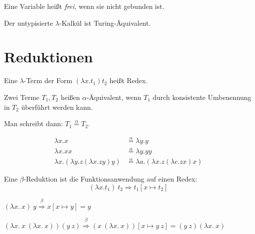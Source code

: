 \begin{definition}%
    Eine Variable heißt \textit{frei}, wenn sie nicht gebunden ist.
\end{definition}

\begin{satz}
    Der untypisierte $\lambda$-Kalkül ist Turing-Äquivalent.
\end{satz}

\section{Reduktionen}
\begin{definition}[Redex]%
    Eine $\lambda$-Term der Form $(\lambda x. t_1) t_2$ heißt Redex.
\end{definition}

\begin{definition}%
    Zwei Terme $T_1, T_2$ heißen $\alpha$-Äquivalent, wenn $T_1$ durch 
    konsistente Umbenennung in $T_2$ überführt werden kann.

    Man schreibt dann: $T_1 \overset{\alpha}{=} T_2$.
\end{definition}

\begin{beispiel}
    \begin{align*}
        \lambda x.x    &\overset{\alpha}{=} \lambda y. y\\
        \lambda x. x x &\overset{\alpha}{=} \lambda y. y y\\
        \lambda x. (\lambda y. z (\lambda x. z y) y) &\overset{\alpha}{=}
        \lambda a. (\lambda x. z (\lambda c. z x) x)
    \end{align*}
\end{beispiel}

\begin{definition}%
    Eine $\beta$-Reduktion ist die Funktionsanwendung auf einen Redex:
    \[(\lambda x. t_1)\ t_2 \Rightarrow t_1 [x \mapsto t_2]\]
\end{definition}

\begin{beispiel}
    \begin{defenum}
        \item $(\lambda x.\ x)\ y \overset{\beta}{\Rightarrow} x[x \mapsto y] = y$
        \item $(\lambda x.\ x\ (\lambda x.\ x)) (y\ z) \overset{\beta}{\Rightarrow} (x\ (\lambda x.\ x))[x \mapsto y\ z] = (y\ z) (\lambda x.\ x)$
    \end{defenum}
\end{beispiel}

